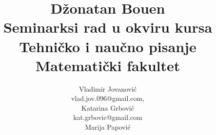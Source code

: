 \documentclass[a4paper]{article}
\begin{document}
\title{Džonatan Bouen\\ \small{Seminarksi rad u okviru kursa\\Tehničko i naučno pisanje\\Matematički fakultet}}

\author{Vladimir Jovanović\\vlad.jov.096@gmail.com, \\ Katarina Grbović\\kat.grbovic@gmail.com \\ Marija Papović}
\maketitle


\tableofcontents
\newpage
\end{document}
